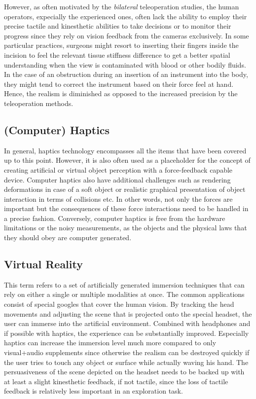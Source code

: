 However, as often motivated by the \emph{bilateral} teleoperation studies, the human operators, expecially the experienced ones, often 
lack the ability to employ their precise tactile and kinesthetic abilities to take decisions or to monitor their progress since they rely 
on vision feedback from the cameras exclusively. In some particular practices, surgeons might resort to inserting their fingers inside 
the incision to feel the relevant tissue stiffness difference to get a better spatial understanding when the view is contaminated with 
blood or other bodily fluids. In the case of an obstruction during an insertion of an instrument into the body, they might tend to 
correct the instrument based on their force feel at hand. Hence, the realism is diminished as opposed to the increased precision by the 
teleoperation methods. 

\subsection[Haptics]{(Computer) Haptics}
In general, haptics technology encompasses all the items that have been covered up to this point. However, it is also often used as a 
placeholder for the concept of creating artificial or virtual object perception with a force-feedback capable device. Computer haptics 
also have additional challenges such as rendering deformations in case of a soft object or realistic graphical presentation of object 
interaction in terms of collisions etc. In other words, not only the forces are important but the consequences of these force 
interactions need to be handled in a precise fashion. Conversely, computer haptics is free from the hardware limitations or the noisy 
measurements, as the objects and the physical laws that they should obey are computer generated. 


\subsection{Virtual Reality}

This term refers to a set of artificially generated immersion techniques that can rely on either a single or multiple modalities at once. 
The common applications consist of special googles that cover the human vision. By tracking the head movements and adjusting the scene 
that is projected onto the special headset, the user can immerse into the artificial environment. Combined with headphones and if possible 
with haptics, the experience can be substantially improved. Especially haptics can increase the immersion level much more compared to 
only visual+audio supplements since otherwise the realism can be destroyed quickly if the user tries to touch any object or surface while 
actually waving his hand. The persuasiveness of the scene depicted on the headset needs to be backed up with at least a slight 
kinesthetic feedback, if not tactile, since the loss of tactile feedback is relatively less important in an exploration task. 
